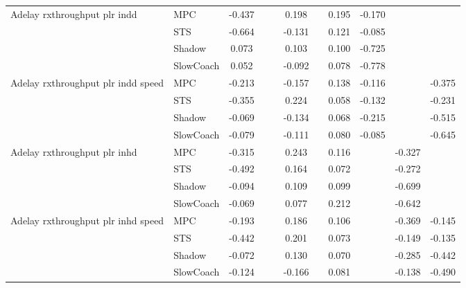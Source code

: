 \begin{tabular}{|l|l|*{9}{c|}}
\midrule
Adelay rxthroughput plr indd    & MPC &   -0.437 &        &        &  0.198 &     &  0.195 &  -0.170 &      &       \\
                              & STS &   -0.664 &        &        & -0.131 &     &  0.121 &  -0.085 &      &       \\
                              & Shadow &    0.073 &        &        &  0.103 &     &  0.100 &  -0.725 &      &       \\
                              & SlowCoach &    0.052 &        &        & -0.092 &     &  0.078 &  -0.778 &      &       \\
\midrule
Adelay rxthroughput plr indd speed    & MPC &   -0.213 &        &        & -0.157 &     &  0.138 &  -0.116 &      &   -0.375 \\
                              & STS &   -0.355 &        &        &  0.224 &     &  0.058 &  -0.132 &      &   -0.231 \\
                              & Shadow &   -0.069 &        &        & -0.134 &     &  0.068 &  -0.215 &      &   -0.515 \\
                              & SlowCoach &   -0.079 &        &        & -0.111 &     &  0.080 &  -0.085 &      &   -0.645 \\
\midrule
Adelay rxthroughput plr inhd    & MPC &   -0.315 &        &        &  0.243 &     &  0.116 &      &  -0.327 &       \\
                              & STS &   -0.492 &        &        &  0.164 &     &  0.072 &      &  -0.272 &       \\
                              & Shadow &   -0.094 &        &        &  0.109 &     &  0.099 &      &  -0.699 &       \\
                              & SlowCoach &   -0.069 &        &        &  0.077 &     &  0.212 &      &  -0.642 &       \\
\midrule
Adelay rxthroughput plr inhd speed    & MPC &   -0.193 &        &        &  0.186 &     &  0.106 &      &  -0.369 &   -0.145 \\
                              & STS &   -0.442 &        &        &  0.201 &     &  0.073 &      &  -0.149 &   -0.135 \\
                              & Shadow &   -0.072 &        &        &  0.130 &     &  0.070 &      &  -0.285 &   -0.442 \\
                              & SlowCoach &   -0.124 &        &        & -0.166 &     &  0.081 &      &  -0.138 &   -0.490 \\

\end{tabular}
